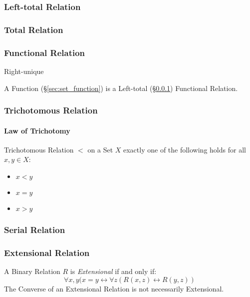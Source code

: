 \subsubsection{Left-total Relation}\label{sec:left_total}

\subsubsection{Total Relation}\label{sec:total_relation}

\subsubsection{Functional Relation}\label{sec:functional_relation}

Right-unique

A Function (\S\ref{sec:set_function}) is a Left-total
(\S\ref{sec:left_total}) Functional Relation.



\subsubsection{Trichotomous Relation}\label{sec:trichotomous_relation}

\paragraph{Law of Trichotomy}\label{sec:trichotomy_law}\hfill

Trichotomous Relation $<$ on a Set $X$ exactly one of the following
holds for all $x,y \in X$:
\begin{itemize}
\item $x < y$
\item $x = y$
\item $x > y$
\end{itemize}



\subsubsection{Serial Relation}\label{sec:serial_relation}

\subsubsection{Extensional Relation}\label{sec:extensional_relation}

A Binary Relation $R$ is \emph{Extensional} if and only if:
\[
  \forall x,y (x = y \leftrightarrow
    \forall z (R(x,z) \leftrightarrow R(y,z))
\]
The Converse of an Extensional Relation is not necessarily
Extensional.

